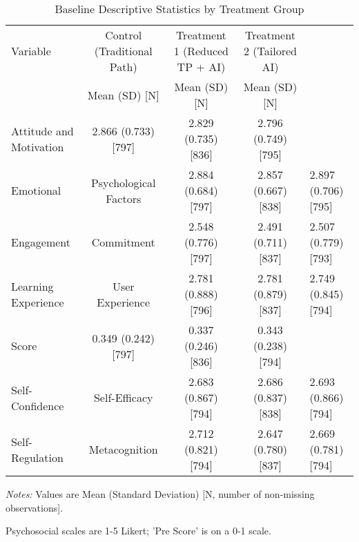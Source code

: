 \begin{table}[htbp]
\centering
\begin{threeparttable}
\caption{Baseline Descriptive Statistics by Treatment Group}
\label{tab:baseline_descriptives_with_n}
\scriptsize
\begin{tabular}{@{}lccc@{}}
\toprule
Variable & Control (Traditional Path) & Treatment 1 (Reduced TP + AI) & Treatment 2 (Tailored AI) \\
 & Mean (SD) [N] & Mean (SD) [N] & Mean (SD) [N]  \\
\midrule
Attitude and Motivation & 2.866 (0.733) [797] & 2.829 (0.735) [836] & 2.796 (0.749) [795]  \\
Emotional & Psychological Factors & 2.884 (0.684) [797] & 2.857 (0.667) [838] & 2.897 (0.706) [795]  \\
Engagement & Commitment & 2.548 (0.776) [797] & 2.491 (0.711) [837] & 2.507 (0.779) [793]  \\
Learning Experience & User Experience & 2.781 (0.888) [796] & 2.781 (0.879) [837] & 2.749 (0.845) [794]  \\
Score & 0.349 (0.242) [797] & 0.337 (0.246) [836] & 0.343 (0.238) [794]  \\
Self-Confidence & Self-Efficacy & 2.683 (0.867) [794] & 2.686 (0.837) [838] & 2.693 (0.866) [794]  \\
Self-Regulation & Metacognition & 2.712 (0.821) [794] & 2.647 (0.780) [837] & 2.669 (0.781) [794]  \\
\bottomrule
\end{tabular}
\begin{tablenotes}
  \item[] \textit{Notes:} Values are Mean (Standard Deviation) [N, number of non-missing observations].
  \item[] Psychosocial scales are 1-5 Likert; 'Pre Score' is on a 0-1 scale.
\end{tablenotes}
\end{threeparttable}
\end{table}
